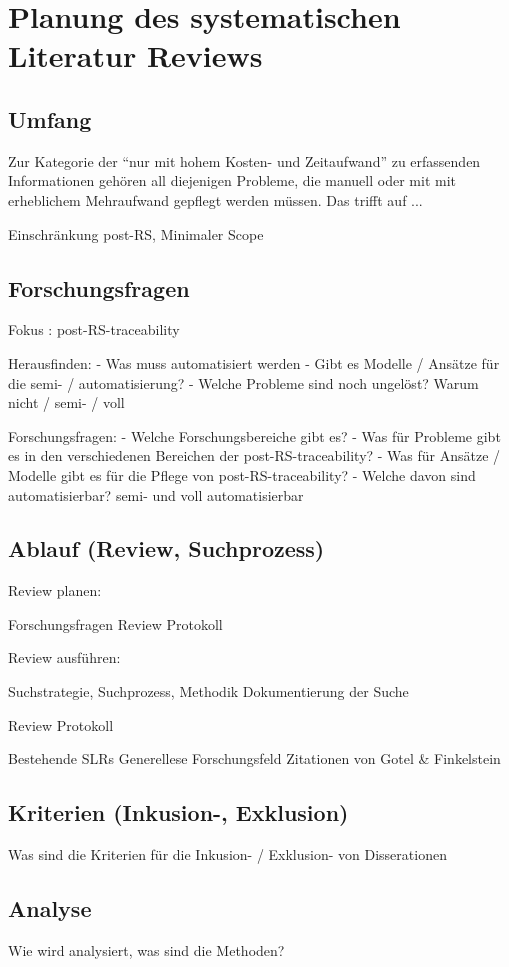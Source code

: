 \section{Planung des systematischen Literatur Reviews}
\subsection{Umfang}
Zur Kategorie der \enquote{nur mit hohem Kosten- und Zeitaufwand} zu erfassenden Informationen gehören all diejenigen Probleme, die manuell oder mit mit erheblichem Mehraufwand gepflegt werden müssen. Das trifft auf ...


Einschränkung post-RS, Minimaler Scope

\subsection{Forschungsfragen}

Fokus : post-RS-traceability

Herausfinden:
- Was muss automatisiert werden
- Gibt es Modelle / Ansätze für die semi- / automatisierung?
- Welche Probleme sind noch ungelöst? Warum nicht / semi- / voll

Forschungsfragen:
- Welche Forschungsbereiche gibt es?
- Was für Probleme gibt es in den verschiedenen Bereichen der post-RS-traceability?
- Was für Ansätze / Modelle gibt es für die Pflege von post-RS-traceability?
- Welche davon sind automatisierbar? semi- und voll automatisierbar

\subsection{Ablauf (Review, Suchprozess)}

Review planen:

Forschungsfragen
Review Protokoll

Review ausführen:

Suchstrategie, Suchprozess, Methodik
Dokumentierung der Suche

Review Protokoll

Bestehende SLRs
Generellese Forschungsfeld
Zitationen von Gotel \& Finkelstein

\subsection{Kriterien (Inkusion-, Exklusion)}

Was sind die Kriterien für die Inkusion- / Exklusion- von Disserationen

\subsection{Analyse}

Wie wird analysiert, was sind die Methoden?


